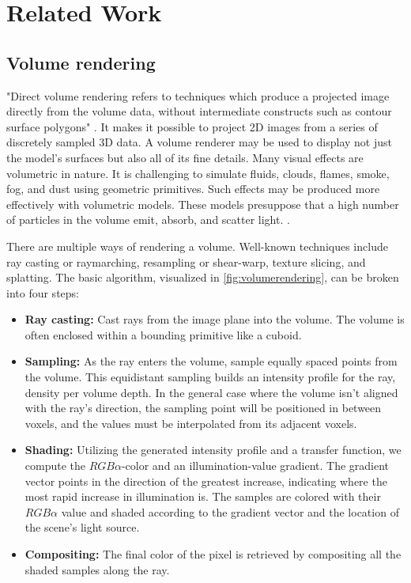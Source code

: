 \chapter{Related Work} \label{chap:relatedwork}

\section{Volume rendering} \label{sec:volumerendering} %
"Direct volume rendering refers to techniques which produce a projected image directly from the volume data, without intermediate constructs such as contour surface polygons" \cite{max_optical_1995}. It makes it possible to project 2D images from a series of discretely sampled 3D data. A volume renderer may be used to display not just the model's surfaces but also all of its fine details. Many visual effects are volumetric in nature. It is challenging to simulate fluids, clouds, flames, smoke, fog, and dust using geometric primitives. Such effects may be produced more effectively with volumetric models. These models presuppose that a high number of particles in the volume emit, absorb, and scatter light. \cite{ikits_chapter_2007}.

There are multiple ways of rendering a volume. Well-known techniques include ray casting or raymarching, resampling or shear-warp, texture slicing, and splatting. The basic algorithm, visualized in \autoref{fig:volumerendering}, can be broken into four steps:

\begin{itemize}
    \item \textbf{Ray casting:} Cast rays from the image plane into the volume. The volume is often enclosed within a bounding primitive like a cuboid.
    \item \textbf{Sampling:} As the ray enters the volume, sample equally spaced points from the volume. This equidistant sampling builds an intensity profile for the ray, density per volume depth. In the general case where the volume isn't aligned with the ray's direction, the sampling point will be positioned in between voxels, and the values must be interpolated from its adjacent voxels.
    \item \textbf{Shading:} Utilizing the generated intensity profile and a transfer function, we compute the $RGB\alpha$-color and an illumination-value gradient. The gradient vector points in the direction of the greatest increase, indicating where the most rapid increase in illumination is. The samples are colored with their $RGB\alpha$ value and shaded according to the gradient vector and the location of the scene's light source.
    \item \textbf{Compositing:} The final color of the pixel is retrieved by compositing all the shaded samples along the ray.
\end{itemize}

